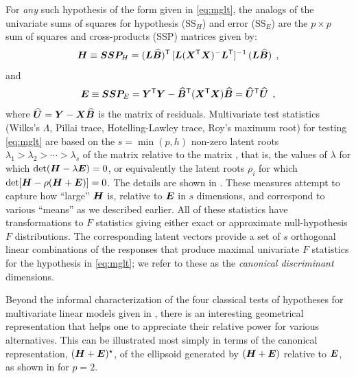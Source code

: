 For \emph{any} such hypothesis of the form given in \eqref{eq:mglt}, the analogs of the univariate
sums of squares for hypothesis ($\mathrm{SS}_H$) and error ($\mathrm{SS}_E$)
are the $p \times p$  sum of squares and cross-products (SSP) matrices given by:
\begin{equation} \label{eq:hmat}
\bm{H}  \equiv \bm{SSP}_H =
 (\bm{L} \widehat{\bm{B}})^\mathsf{T} \,
 [\bm{L} (\bm{X}^\mathsf{T} \bm{X} )^{-} \bm{L}^\mathsf{T}]^{-1} \,
 (\bm{L} \widehat{\bm{B}})
 \:\: ,
\end{equation}
and
\begin{equation} \label{eq:emat}
\bm{E}  \equiv \bm{SSP}_E =
 \bm{Y}^\mathsf{T} \bm{Y} -
 \widehat{\bm{B}}^\mathsf{T} (\bm{X}^\mathsf{T} \bm{X}) \widehat{\bm{B}}
 =
  \widehat{\bm{U}}^\mathsf{T}  \widehat{\bm{U}}
 \:\: ,
\end{equation}
where $\widehat{\bm{U}} = \bm{Y} - \bm{X} \widehat{\bm{B}}$ is the matrix of residuals.
Multivariate test statistics (Wilks's $\Lambda$, Pillai trace, Hotelling-Lawley trace, Roy's maximum root)
for testing \eqref{eq:mglt} are based on the $s = \min(p, h)$ non-zero latent roots
$\lambda_{1}>\lambda_{2}>\cdots>\lambda_{s}$ of
the matrix  relative to the matrix , that is,
the values of $\lambda$ for which $
\mathrm{det} (\bm{H}-\lambda\bm{E})=0$, or equivalently
the latent roots $\rho_i$ for which $\mathrm{det} [\bm{H} - \rho (\bm{H}+\bm{E})]=0$.
The details are shown in .
These measures
attempt to capture how ``large'' $\bm{H}$ is, relative to
$\bm{E}$ in $s$ dimensions, and correspond to various ``means'' as we described earlier.
All of these statistics have transformations to $F$ statistics
giving either exact or approximate null-hypothesis $F$ distributions.
The corresponding latent vectors provide a
set of $s$ orthogonal linear combinations of the responses that produce
maximal univariate $F$ statistics for the hypothesis in \eqref{eq:mglt};
we refer to these as the \emph{canonical discriminant} dimensions.



Beyond the informal characterization of the four classical tests of hypotheses for multivariate linear 
models given in
, there is an interesting geometrical representation 
that helps one to appreciate their relative power for various alternatives.  
This can be illustrated most simply in terms of 
the canonical representation,  $(\bm{H}+\bm{E})^\star$,
of the ellipsoid generated by $(\bm{H} + \bm{E})$ relative to $\bm{E}$,
as shown in  for $p=2$. 


